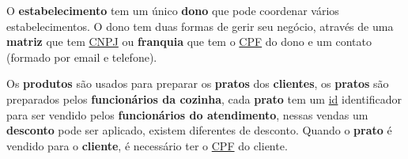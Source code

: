 \documentclass[12pt, a4paper]{article}
\begin{document}
O \textbf{estabelecimento} tem um único \textbf{dono} que pode coordenar vários estabelecimentos. O dono tem duas formas de gerir seu negócio, através de uma \textbf{matriz} que tem \underline{CNPJ} ou \textbf{franquia} que tem o \underline{CPF} do dono e um contato (formado por email e telefone).

Os \textbf{produtos} são usados para preparar os \textbf{pratos} dos \textbf{clientes}, os \textbf{pratos} são preparados pelos \textbf{funcionários da cozinha}, cada \textbf{prato} tem um \underline{id} identificador para ser vendido pelos \textbf{funcionários do atendimento}, nessas vendas um \textbf{desconto} pode ser aplicado, existem diferentes  de desconto. Quando o \textbf{prato} é vendido para o \textbf{cliente}, é necessário ter o \underline{CPF} do cliente.
\end{document}
